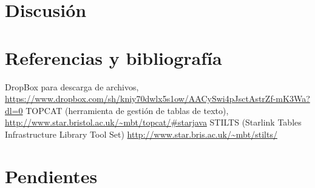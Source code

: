 \documentclass[a4paper,headsepline,footsepline,draft=false]{scrartcl}
\def\borrador{}
\begin{document}
\section{Discusión}

\section{Referencias y bibliografía}

\begin{thebibliography}{50}
		DropBox para descarga de archivos, 
		\url{https://www.dropbox.com/sh/kniy70dwlx5s1ow/AACySwi4pJsctAstrZf-mK3Wa?dl=0}
		TOPCAT (herramienta de gestión de tablas de texto), 
		\url{http://www.star.bristol.ac.uk/~mbt/topcat/#starjava}
		STILTS (Starlink Tables Infrastructure Library Tool Set)
		\url{http://www.star.bris.ac.uk/~mbt/stilts/}
\end{thebibliography}

\ifdefined\borrador
\section*{Pendientes}
	\listoftodos
\fi
\end{document}
